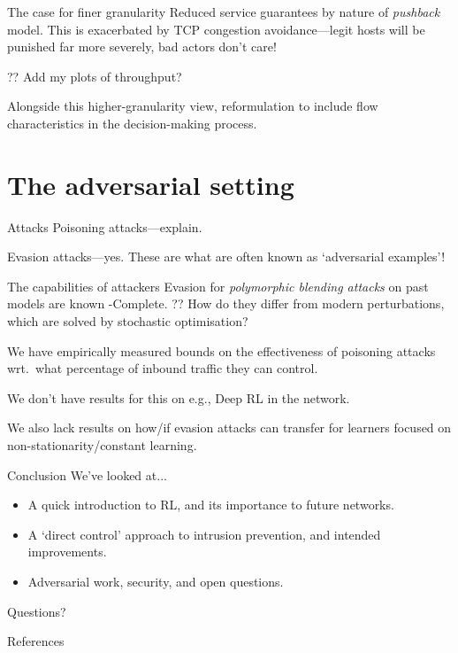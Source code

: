 \documentclass[aspectratio=169,xcolor={dvipsnames}
,hide notes
]{beamer}
\begin{document}
\begin{frame}{The case for finer granularity}
	Reduced service guarantees by nature of \emph{pushback} model.
	This is exacerbated by TCP congestion avoidance---legit hosts will be punished far more severely, bad actors don't care!
	
	?? Add my plots of throughput?
	
	Alongside this higher-granularity view, reformulation to include flow characteristics in the decision-making process.
\end{frame}

\section{The adversarial setting}

\begin{frame}{Attacks}
	Poisoning attacks---explain.
	
	Evasion attacks---yes. These are what are often known as `adversarial examples'!
\end{frame}

\begin{frame}{The capabilities of attackers}
	Evasion for \emph{polymorphic blending attacks} on past models are known \NP-Complete. ?? How do they differ from modern perturbations, which are solved by stochastic optimisation?
	
	We have empirically measured bounds on the effectiveness of poisoning attacks wrt.\ what percentage of inbound traffic they can control.
	
	We don't have results for this on e.g., Deep RL in the network.
	
	We also lack results on how/if evasion attacks can transfer for learners focused on non-stationarity/constant learning.
\end{frame}

\begin{frame}[standout]{Conclusion}
	We've looked at...
	\begin{itemize}
		\item A quick introduction to RL, and its \alert{importance to future networks}.
		\item A `direct control' approach to intrusion prevention, and \alert{intended improvements}.
		\item Adversarial work, security, and open questions.
	\end{itemize}
	
	\alert{Questions?}
\end{frame}

\appendix

\begin{frame}[allowframebreaks]{References}
\printbibliography[heading=none]
\end{frame}
\end{document}

